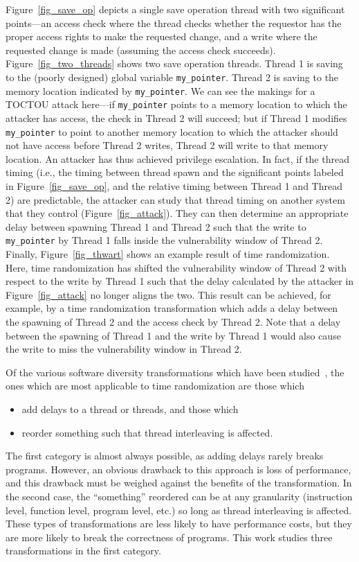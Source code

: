Figure~\ref{fig_save_op} depicts a single save operation thread with two significant points---an access check where the thread checks whether the requestor has the proper access rights to make the requested change, and a write where the requested change is made (assuming the access check succeeds).
Figure~\ref{fig_two_threads} shows two save operation threads.
Thread 1 is saving to the (poorly designed) global variable \texttt{my\_pointer}.
Thread 2 is saving to the memory location indicated by \texttt{my\_pointer}.
We can see the makings for a TOCTOU attack here---if \texttt{my\_pointer} points to a memory location to which the attacker has access, the check in Thread 2 will succeed; but if Thread 1 modifies \texttt{my\_pointer} to point to another memory location to which the attacker should not have access before Thread 2 writes, Thread 2 will write to that memory location.
An attacker has thus achieved privilege escalation.
In fact, if the thread timing (i.e., the timing between thread spawn and the significant points labeled in Figure~\ref{fig_save_op}, and the relative timing between Thread 1 and Thread 2) are predictable, the attacker can study that thread timing on another system that they control (Figure~\ref{fig_attack}).
They can then determine an appropriate delay between spawning Thread 1 and Thread 2 such that the write to \texttt{my\_pointer} by Thread 1 falls inside the vulnerability window of Thread 2.
Finally, Figure~\ref{fig_thwart} shows an example result of time randomization.
Here, time randomization has shifted the vulnerability window of Thread 2 with respect to the write by Thread 1 such that the delay calculated by the attacker in Figure~\ref{fig_attack} no longer aligns the two.
This result can be achieved, for example, by a time randomization transformation which adds a delay between the spawning of Thread 2 and the access check by Thread 2.
Note that a delay between the spawning of Thread 1 and the write by Thread 1 would also cause the write to miss the vulnerability window in Thread 2.

Of the various software diversity transformations which have been studied~\cite{Larsen2014}, the ones which are most applicable to time randomization are those which
\begin{itemize}\addtolength{\itemsep}{-.35\baselineskip}
	\item add delays to a thread or threads, and those which
	\item reorder something such that thread interleaving is affected.
\end{itemize}
The first category is almost always possible, as adding delays rarely breaks programs.
However, an obvious drawback to this approach is loss of performance, and this drawback must be weighed against the benefits of the transformation.
In the second case, the ``something'' reordered can be at any granularity (instruction level, function level, program level, etc.) so long as thread interleaving is affected.
These types of transformations are less likely to have performance costs, but they are more likely to break the correctness of programs.
This work studies three transformations in the first category.

